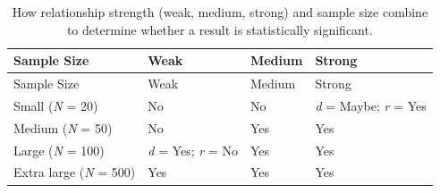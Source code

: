 \documentclass[
]{krantz}
\begin{document}
\begin{longtable}[]{@{}
  >{\raggedright\arraybackslash}p{}
  >{\raggedright\arraybackslash}p{}
  >{\raggedright\arraybackslash}p{}
  >{\raggedright\arraybackslash}p{}@{}}
\caption{\label{tab:strength} How relationship strength (weak, medium, strong) and sample size combine to determine whether a result is statistically significant.}\tabularnewline
\toprule\noalign{}
\begin{minipage}[b]{\linewidth}\raggedright
Sample Size
\end{minipage} & \begin{minipage}[b]{\linewidth}\raggedright
Weak
\end{minipage} & \begin{minipage}[b]{\linewidth}\raggedright
Medium
\end{minipage} & \begin{minipage}[b]{\linewidth}\raggedright
Strong
\end{minipage} \\
\midrule\noalign{}
\endfirsthead
\toprule\noalign{}
\begin{minipage}[b]{\linewidth}\raggedright
Sample Size
\end{minipage} & \begin{minipage}[b]{\linewidth}\raggedright
Weak
\end{minipage} & \begin{minipage}[b]{\linewidth}\raggedright
Medium
\end{minipage} & \begin{minipage}[b]{\linewidth}\raggedright
Strong
\end{minipage} \\
\midrule\noalign{}
\endhead
\bottomrule\noalign{}
\endlastfoot
Small (\emph{N} = 20) & No & No & \emph{d} = Maybe; \emph{r} = Yes \\
Medium (\emph{N} = 50) & No & Yes & Yes \\
Large (\emph{N} = 100) & \emph{d} = Yes; \emph{r} = No & Yes & Yes \\
Extra large (\emph{N} = 500) & Yes & Yes & Yes \\
\end{longtable}
\end{document}
